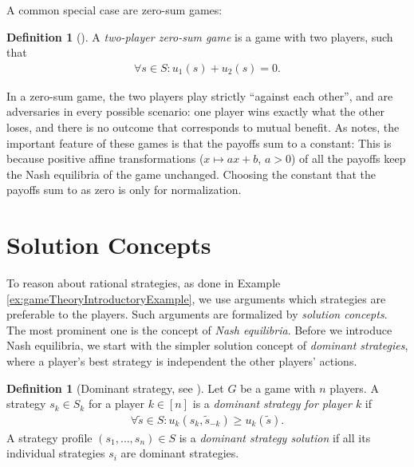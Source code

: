 \documentclass[a4paper]{scrreprt}
\theoremstyle{definition}
\newtheorem{defn}[thm]{Definition} %
\begin{document}
    A common special case are zero-sum games:
    
    \begin{defn}[{\cite[p.4]{bib:fudenbergGameTheory}}]
        A \emph{two-player zero-sum game} is a game with two players, such that
        \begin{gather*} 
            \forall s \in S: u_1(s) + u_2(s) = 0.
        \end{gather*}
    \end{defn}

    In a zero-sum game, the two players play strictly “against each other”, and are adversaries in every possible scenario:
    one player wins exactly what the other loses, and there is no outcome that corresponds to mutual benefit. As \cite{bib:fudenbergGameTheory} notes, the important feature of these games is that the payoffs sum to a constant: 
    This is because positive affine transformations ($x \mapsto ax + b$, $a > 0$) of all the payoffs keep the Nash equilibria of the game unchanged.
    Choosing the constant that the payoffs sum to as zero is only for normalization.
    
    \section{Solution Concepts}
    To reason about rational strategies, as done in Example \ref{ex:gameTheoryIntroductoryExample}, we use arguments which strategies are preferable to the players. Such arguments are formalized by \emph{solution concepts}.
    The most prominent one is the concept of \emph{Nash equilibria}.
    Before we introduce Nash equilibria, we start with the simpler solution concept of \emph{dominant strategies}, where a player's best strategy is independent the other players' actions.
    
    \begin{defn}[Dominant strategy, see \cite{bib:nisanAlgorithmicGameTheoryCh1Basic}]
        Let $G$ be a game with $n$ players.
        A strategy $s_k \in S_k$ for a player $k \in [n]$ is a \emph{dominant strategy for player $k$} if 
        \begin{gather*}  
            \forall \tilde{s} \in S: u_k(s_k, \tilde{s}_{-k}) \geq u_k(\tilde{s}). 
        \end{gather*} 
        A strategy profile $(s_1, \dots, s_n) \in S$ is a \emph{dominant strategy solution} if all its individual strategies $s_i$ are dominant strategies.
    \end{defn}
    
\end{document}
